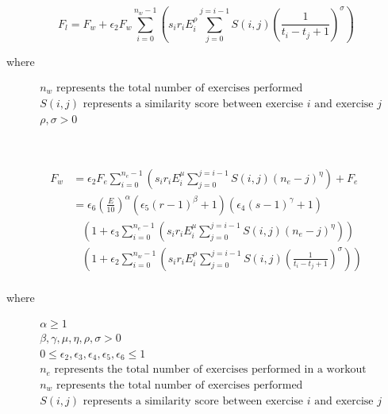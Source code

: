 \begin{minipage}{\textwidth}
	\begin{equation*}
		F_l =
			F_{w} + 
			\epsilon_2 F_w
			\sum_{i=0}^{n_w-1} \left( 
				s_i r_i E_i^\rho
				\sum_{j=0}^{j=i-1} S(i,j)\left(
					\frac{1}{t_i-t_j+1}
				\right)^\sigma
			\right)
	\end{equation*}
	\centerline{where}
	\begin{equation*}
		\begin{split}
			& n_w \text{ represents the total number of exercises performed} \\
			& S(i,j) \text{ represents a similarity score between exercise }i \text{ and exercise }j \\
			& \rho, \sigma >0
		\end{split}
	\end{equation*}
\end{minipage}\\

\begin{minipage}{\textwidth}
	\begin{equation}
		\label{eq:P2C1_InterWorkoutFatigue}
		\begin{split}
			F_w & = 
			\epsilon_2 F_e 
			\sum_{i=0}^{n_e-1} \left( 
				s_i r_i E_i^\mu 
				\sum_{j=0}^{j=i-1} S(i,j)(n_e-j)^\eta
			\right)
			+ F_e
			\\
			& = \epsilon_6 \left( \frac{E}{10} \right)^\alpha
				\left( \epsilon_5 (r-1)^\beta + 1 \right)
				\left(\epsilon_4 (s-1)^\gamma+1  \right)
				\\
				& \;\;\;
				\left(
					1+\epsilon_3 \sum_{i=0}^{n_e-1} \left( 
						s_i r_i E_i^\mu 
						\sum_{j=0}^{j=i-1} S(i,j)(n_e-j)^\eta
					\right)
				\right)
				\\
				& \;\;\;
				\left(
					1+\epsilon_2 \sum_{i=0}^{n_w-1} \left( 
						s_i r_i E_i^\rho
						\sum_{j=0}^{j=i-1} S(i,j)\left(
							\frac{1}{t_i-t_j+1}
						\right)^\sigma
					\right)
				\right)
			\\
		\end{split}
	\end{equation}
	\centerline{where}
	\begin{equation*}
		\begin{split}
		    & \alpha \ge 1 \\
		    & \beta,\gamma, \mu, \eta, \rho, \sigma > 0 \\
			& 0 \le \epsilon_2, \epsilon_3, \epsilon_4, \epsilon_5, \epsilon_6 \le 1 \\
			& n_e \text{ represents the total number of exercises performed in a workout} \\
			& n_w \text{ represents the total number of exercises performed} \\
			& S(i,j) \text{ represents a similarity score between exercise }i \text{ and exercise }j \\
		\end{split}
	\end{equation*}
\end{minipage}\\

